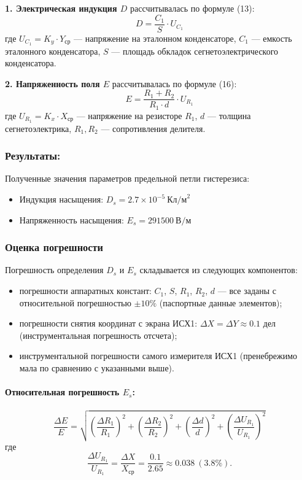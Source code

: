\documentclass[a4paper,14pt]{article}
\begin{document}
\textbf{1. Электрическая индукция \(D\)} рассчитывалась по формуле (13):
\[
D = \frac{C_1}{S} \cdot U_{C_1}
\]
где \(U_{C_1} = K_y \cdot Y_{ср}\) — напряжение на эталонном конденсаторе, \(C_1\) — емкость эталонного конденсатора, \(S\) — площадь обкладок сегнетоэлектрического конденсатора.

\textbf{2. Напряженность поля \(E\)} рассчитывалась по формуле (16):
\[
E = \frac{R_1 + R_2}{R_1 \cdot d} \cdot U_{R_1}
\]
где \(U_{R_1} = K_x \cdot X_{ср}\) — напряжение на резисторе \(R_1\), \(d\) — толщина сегнетоэлектрика, \(R_1, R_2\) — сопротивления делителя.


\subsubsection*{Результаты:}

Полученные значения параметров предельной петли гистерезиса:
\begin{itemize}
    \item Индукция насыщения: \(\boxed{D_s = 2.7 \times 10^{-5} \ \text{Кл/м}^2}\)
    \item Напряженность насыщения: \(\boxed{E_s = 291500 \ \text{В/м}}\)

\end{itemize}

\subsubsection*{Оценка погрешности}

Погрешность определения \(D_s\) и \(E_s\) складывается из следующих компонентов:
\begin{itemize}
    \item погрешности аппаратных констант: \(C_1\), \(S\), \(R_1\), \(R_2\), \(d\) — все заданы с относительной погрешностью \(\pm 10\%\) (паспортные данные элементов);
    \item погрешности снятия координат с экрана ИСХ1: \(\Delta X = \Delta Y \approx 0.1\) дел (инструментальная погрешность отсчета);
    \item инструментальной погрешности самого измерителя ИСХ1 (пренебрежимо мала по сравнению с указанными выше).
\end{itemize}

\paragraph{Относительная погрешность \(E_s\):}
\[
\frac{\Delta E}{E} = \sqrt{ \left( \frac{\Delta R_1}{R_1} \right)^2 + \left( \frac{\Delta R_2}{R_2} \right)^2 + \left( \frac{\Delta d}{d} \right)^2 + \left( \frac{\Delta U_{R_1}}{U_{R_1}} \right)^2 }
\]
где
\[
\frac{\Delta U_{R_1}}{U_{R_1}} = \frac{\Delta X}{X_{ср}} = \frac{0.1}{2.65} \approx 0.038 \ (3.8\%).
\]
\end{document}
